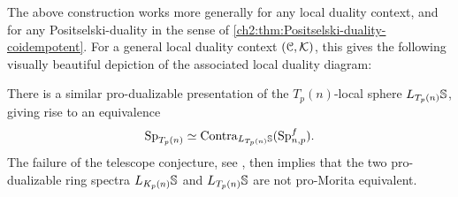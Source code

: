 \begin{remark}
    The above construction works more generally for any local duality context, and for any Positselski-duality in the sense of \cref{ch2:thm:Positselski-duality-coidempotent}. For a general local duality context $(\C, \K)$, this gives the following visually beautiful depiction of the associated local duality diagram:
    \begin{center}
    \end{center}
\end{remark}

\begin{remark}
    There is a similar pro-dualizable presentation of the $T_p(n)$-local sphere $L_{T_p(n)}\S$, giving rise to an equivalence
    \[\Sp_{T_p(n)}\simeq \Contra_{L_{T_p(n)}\S}(\Sp\np^f).\]
    The failure of the telescope conjecture, see \cite{burklund-hahn-levy-schlank_23}, then implies that the two pro-dualizable ring spectra $L_{K_p(n)}\S$ and $L_{T_p(n)}\S$ are not pro-Morita equivalent.  
\end{remark}

